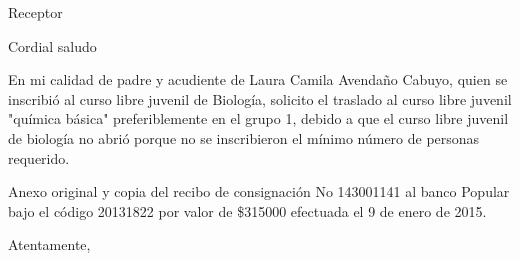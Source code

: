 \documentclass[letterpaper,spanish,11pt]{letter}
\date{5 de marzo de 2015}
\begin{document}
\begin{letter}{Receptor}
	
\opening{Cordial saludo}
En mi calidad de padre y acudiente de Laura Camila Avendaño Cabuyo, quien se inscribió al curso libre juvenil de Biología, solicito el traslado al curso libre juvenil "química básica" preferiblemente en el grupo 1, debido a que el curso libre juvenil de biología no abrió porque no se inscribieron el mínimo número de personas requerido.

Anexo original y copia del recibo de consignación No 143001141 al banco Popular bajo el código 20131822 por valor de \$315000 efectuada el 9 de enero de 2015.
\closing{Atentamente,}


\end{letter}
\end{document}

